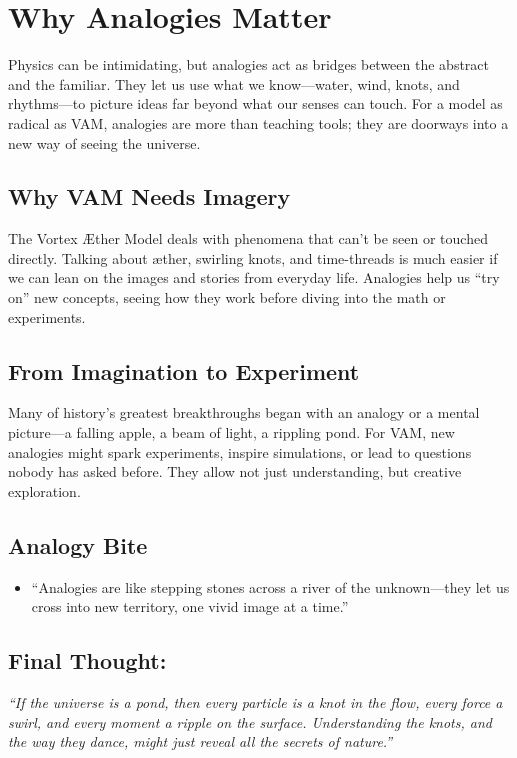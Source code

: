 
\section{Why Analogies Matter}

Physics can be intimidating, but analogies act as bridges between the abstract and the familiar. They let us use what we know—water, wind, knots, and rhythms—to picture ideas far beyond what our senses can touch. For a model as radical as VAM, analogies are more than teaching tools; they are doorways into a new way of seeing the universe.


\subsection*{Why VAM Needs Imagery}

The Vortex Æther Model deals with phenomena that can’t be seen or touched directly. Talking about æther, swirling knots, and time-threads is much easier if we can lean on the images and stories from everyday life. Analogies help us “try on” new concepts, seeing how they work before diving into the math or experiments.


\subsection*{From Imagination to Experiment}

Many of history’s greatest breakthroughs began with an analogy or a mental picture—a falling apple, a beam of light, a rippling pond. For VAM, new analogies might spark experiments, inspire simulations, or lead to questions nobody has asked before. They allow not just understanding, but creative exploration.


\subsection*{Analogy Bite}

\begin{itemize}

\item
“Analogies are like stepping stones across a river of the unknown—they let us cross into new territory, one vivid image at a time.”




\end{itemize}

\subsection*{Final Thought:}

\textit{“If the universe is a pond, then every particle is a knot in the flow, every force a swirl, and every moment a ripple on the surface. Understanding the knots, and the way they dance, might just reveal all the secrets of nature.”}